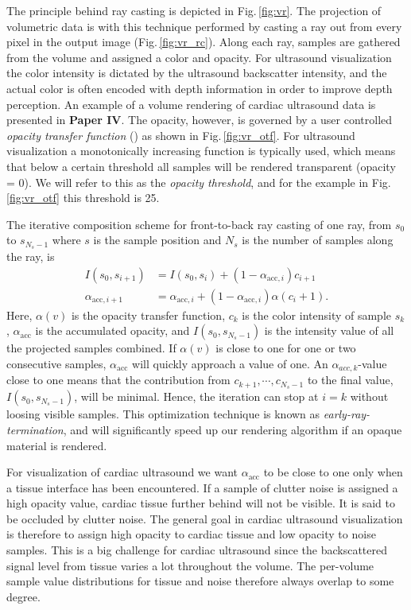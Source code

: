 The principle behind ray casting is depicted in Fig.\,\ref{fig:vr}. The projection of volumetric data is with this technique performed by casting a ray out from every pixel in the output image (Fig.\,\ref{fig:vr_rc}). Along each ray, samples are gathered from the volume and assigned a color and opacity. For ultrasound visualization the color intensity is dictated by the ultrasound backscatter intensity, and the actual color is often encoded with depth information in order to improve depth perception. An example of a volume rendering of cardiac ultrasound data is presented in \textbf{Paper IV}. The opacity, however, is governed by a user controlled \textit{opacity transfer function} () as shown in Fig.\,\ref{fig:vr_otf}. For ultrasound visualization a monotonically increasing function is typically used, which means that below a certain threshold all samples will be rendered transparent (opacity = 0). We will refer to this as the \textit{opacity threshold}, and for the example in Fig.\,\ref{fig:vr_otf} this threshold is 25.

The iterative composition scheme for front-to-back ray casting of one ray, from $s_0$ to $s_{N_s-1}$ where $s$ is the sample position and $N_s$ is the number of samples along the ray, is \cite{rtvg2006}
\begin{align}
I(s_0, s_{i+1}) &= I(s_0, s_{i}) + (1 - \alpha_{\text{acc},i}) c_{i+1}\\
\alpha_{\text{acc},i+1} &= \alpha_{\text{acc},i} + (1 - \alpha_{\text{acc},i}) \alpha(c_i+1).
\label{eq:fronToBack}
\end{align}
Here, $\alpha(v)$ is the opacity transfer function, $c_{k}$ is the color intensity of sample $s_{k}$, $\alpha_{\text{acc}}$ is the accumulated opacity, and $I(s_0, s_{N_s-1})$ is the intensity value of all the projected samples combined. If $\alpha(v)$ is close to one for one or two consecutive samples, $\alpha_{\text{acc}}$ will quickly approach a value of one. An $\alpha_{acc,k}$-value close to one means that the contribution from $c_{k+1}, \cdots, c_{N_s-1}$ to the final value, $I(s_0, s_{N_s-1})$, will be minimal. Hence, the iteration can stop at $i=k$ without loosing visible samples. This optimization technique is known as \textit{early-ray-termination}, and will significantly speed up our rendering algorithm if an opaque material is rendered.

For visualization of cardiac ultrasound we want $\alpha_{\text{acc}}$ to be close to one only when a tissue interface has been encountered. If a sample of clutter noise is assigned a high opacity value, cardiac tissue further behind will not be visible. It is said to be occluded by clutter noise. The general goal in cardiac ultrasound visualization is therefore to assign high opacity to cardiac tissue and low opacity to noise samples. This is a big challenge for cardiac ultrasound since the backscattered signal level from tissue varies a lot throughout the volume. The per-volume sample value distributions for tissue and noise therefore always overlap to some degree.

